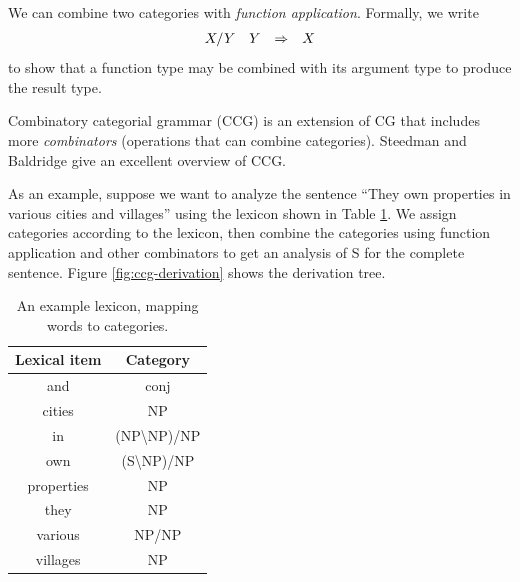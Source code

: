 \documentclass[a4paper]{article}
\begin{document}
We can combine two categories with {\em function application}. Formally, we write
\begin{equation}
\begin{array}{cccc} X/Y & Y & \Rightarrow & X \end{array}\label{eqn:forward-app}
\end{equation}
to show that a function type may be combined with its argument type to produce the result type.

Combinatory categorial grammar (CCG) is an extension of CG that includes more {\em combinators} (operations that can combine categories). Steedman and Baldridge  give an excellent overview of CCG.

As an example, suppose we want to analyze the sentence ``They own properties in various cities and villages'' using the lexicon shown in Table \ref{table:lexicon}. We assign categories according to the lexicon, then combine the categories using function application and other combinators to get an analysis of S for the complete sentence. Figure \ref{fig:ccg-derivation} shows the derivation tree.

\begin{table}
\centering
\begin{tabular}{|c|c|}
\hline
Lexical item & Category \\
\hline
and & conj \\
cities & NP \\
in &  (NP\textbackslash NP)/NP \\
own & (S\textbackslash NP)/NP \\
properties & NP \\
they & NP \\
various & NP/NP \\
villages & NP \\
\hline
\end{tabular}
\caption{An example lexicon, mapping words to categories.\label{table:lexicon}}
\end{table}
\end{document}
